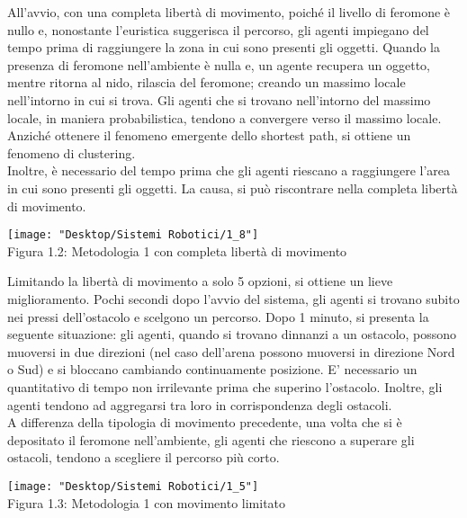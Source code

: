 \documentclass[12pt,a4paper,openright,twoside]{report}
\begin{document}
All'avvio, con una completa libertà di movimento, poiché il livello di feromone è nullo e, nonostante l'euristica suggerisca il percorso, gli agenti impiegano del tempo prima di raggiungere la zona in cui sono presenti gli oggetti. Quando la presenza di feromone nell'ambiente è nulla e, un agente recupera un oggetto, mentre ritorna al nido, rilascia del feromone; creando un massimo locale nell'intorno in cui si trova. Gli agenti che si trovano nell'intorno del massimo locale, in maniera probabilistica, tendono a convergere verso il massimo locale. Anziché ottenere il fenomeno emergente dello shortest path, si ottiene un fenomeno di clustering.\\
Inoltre, è necessario del tempo prima che gli agenti riescano a raggiungere l'area in cui sono presenti gli oggetti. La causa, si può riscontrare nella completa libertà di movimento.\\

\begin{center}  
	\texttt{[image: "Desktop/Sistemi Robotici/1\_8"]}
	\\Figura 1.2: Metodologia 1 con completa libertà di movimento
\end{center}

Limitando la libertà di movimento a solo 5 opzioni, si ottiene un lieve miglioramento. Pochi secondi dopo l'avvio del sistema, gli agenti si trovano subito nei pressi dell'ostacolo e scelgono un percorso. Dopo 1 minuto, si presenta la seguente situazione: gli agenti, quando si trovano dinnanzi a un ostacolo, possono muoversi in due direzioni (nel caso dell'arena possono muoversi in direzione Nord o Sud) e si bloccano cambiando continuamente posizione. E' necessario un quantitativo di tempo non irrilevante prima che superino l'ostacolo. Inoltre, gli agenti tendono ad aggregarsi tra loro in corrispondenza degli ostacoli.\\ A differenza della tipologia di movimento precedente, una volta che si è depositato il feromone nell'ambiente, gli agenti che riescono a superare gli ostacoli, tendono a scegliere il percorso più corto.\\

\begin{center}  
	\texttt{[image: "Desktop/Sistemi Robotici/1\_5"]}
	\\Figura 1.3: Metodologia 1 con movimento limitato
\end{center}
\end{document}
